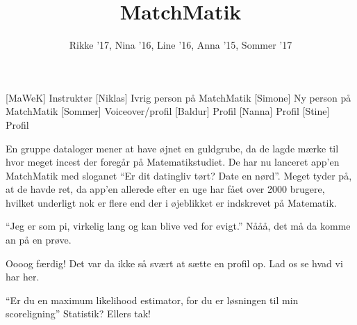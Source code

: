 \documentclass[a4paper,11pt]{article}
\title{MatchMatik}
\author{Rikke '17, Nina '16, Line '16, Anna '15, Sommer '17}
\begin{document}
\maketitle

\begin{roles}
[MaWeK] Instruktør
[Niklas] Ivrig person på MatchMatik
[Simone] Ny person på MatchMatik
[Sommer] Voiceover/profil
[Baldur] Profil
[Nanna] Profil
[Stine] Profil
\end{roles}

\begin{props}
\end{props}


\begin{sketch}

 En gruppe dataloger mener at have øjnet en guldgrube, da de lagde mærke til hvor meget incest der foregår på Matematikstudiet. De har nu lanceret app'en MatchMatik med sloganet ``Er dit datingliv tørt? Date en nørd''. Meget tyder på, at de havde ret, da app'en allerede efter en uge har fået over 2000 brugere, hvilket underligt nok er flere end der i øjeblikket er indskrevet på Matematik.



 ``Jeg er som pi, virkelig lang og kan blive ved for evigt.'' Nååå,  det må da komme an på en prøve.


 Oooog færdig! Det var da ikke så svært at sætte en profil op. Lad os se hvad vi har her.


 ``Er du en maximum likelihood estimator, for du er løsningen til min scoreligning'' Statistik? Ellers tak!


\end{sketch}
\end{document}

